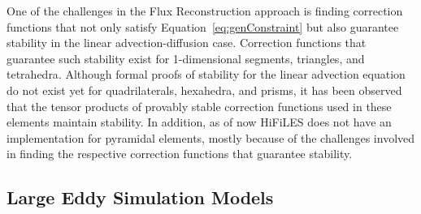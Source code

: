 One of the challenges in the Flux Reconstruction approach is finding correction functions that not only satisfy Equation~\eqref{eq:genConstraint} but also guarantee stability in the linear advection-diffusion case. Correction functions that guarantee such stability exist for 1-dimensional segments\cite{vincent2011new}, triangles\cite{castonguay2012new,williams2013tri}, and tetrahedra\cite{williams2013tet}. Although formal proofs of stability for the linear advection equation do not exist yet for quadrilaterals, hexahedra, and prisms, it has been observed that the tensor products of provably stable correction functions used in these elements maintain stability. In addition, as of now HiFiLES does not have an implementation for pyramidal elements, mostly because of the challenges involved in finding the respective correction functions that guarantee stability.




\subsection{Large Eddy Simulation Models}\label{lesmodels}

